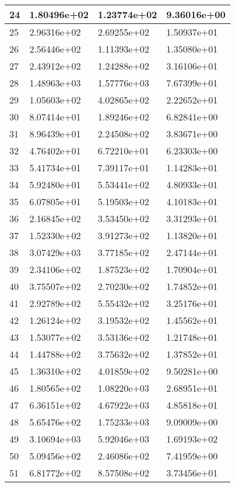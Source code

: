 \documentclass{article}
\begin{document}
\begin{table}[H]
{\begin{tabular}{|l|l|l|l|}
24 & 1.80496e+02 & 1.23774e+02 & 9.36016e+00 \\ \hline
25 & 2.96316e+02 & 2.69255e+02 & 1.50937e+01 \\ \hline
26 & 2.56446e+02 & 1.11393e+02 & 1.35080e+01 \\ \hline
27 & 2.43912e+02 & 1.24288e+02 & 3.16106e+01 \\ \hline
28 & 1.48963e+03 & 1.57776e+03 & 7.67399e+01 \\ \hline
29 & 1.05603e+02 & 4.02865e+02 & 2.22652e+01 \\ \hline
30 & 8.07414e+01 & 1.89246e+02 & 6.82841e+00 \\ \hline
31 & 8.96439e+01 & 2.24508e+02 & 3.83671e+00 \\ \hline
32 & 4.76402e+01 & 6.72210e+01 & 6.23303e+00 \\ \hline
33 & 5.41734e+01 & 7.39117e+01 & 1.14283e+01 \\ \hline
34 & 5.92480e+01 & 5.53441e+02 & 4.80933e+01 \\ \hline
35 & 6.07805e+01 & 5.19503e+02 & 4.10183e+01 \\ \hline
36 & 2.16845e+02 & 3.53450e+02 & 3.31293e+01 \\ \hline
37 & 1.52330e+02 & 3.91273e+02 & 1.13820e+01 \\ \hline
38 & 3.07429e+03 & 3.77185e+02 & 2.47144e+01 \\ \hline
39 & 2.34106e+02 & 1.87523e+02 & 1.70904e+01 \\ \hline
40 & 3.75507e+02 & 2.70230e+02 & 1.74852e+01 \\ \hline
41 & 2.92789e+02 & 5.55432e+02 & 3.25176e+01 \\ \hline
42 & 1.26124e+02 & 3.19532e+02 & 1.45562e+01 \\ \hline
43 & 1.53077e+02 & 3.53136e+02 & 1.21748e+01 \\ \hline
44 & 1.44788e+02 & 3.75632e+02 & 1.37852e+01 \\ \hline
45 & 1.36310e+02 & 4.01859e+02 & 9.50281e+00 \\ \hline
46 & 1.80565e+02 & 1.08220e+03 & 2.68951e+01 \\ \hline
47 & 6.36151e+02 & 4.67922e+03 & 4.85818e+01 \\ \hline
48 & 5.65476e+02 & 1.75233e+03 & 9.09009e+00 \\ \hline
49 & 3.10694e+03 & 5.92046e+03 & 1.69193e+02 \\ \hline
50 & 5.09456e+02 & 2.46086e+02 & 7.41959e+00 \\ \hline
51 & 6.81772e+02 & 8.57508e+02 & 3.73456e+01 \\ \hline

\end{tabular}}
\end{table}
\end{document}

